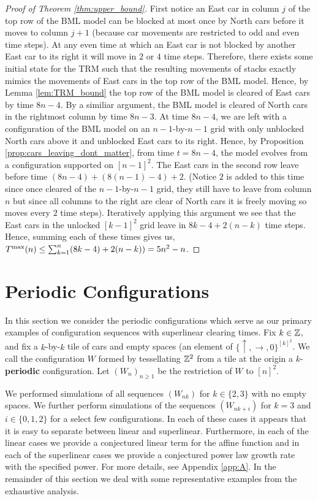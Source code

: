 \documentclass[reqno]{amsart}
\begin{document}
\begin{proof} [Proof of Theorem \ref{thm:upper_bound}]
    First notice an East car in column $j$ of the top row of the BML model can be blocked at most once by North cars before it moves to column $j+1$ (because car movements are restricted to odd and even time steps). At any even time at which an East car is not blocked by another East car to its right it will move in $2$ or $4$ time steps. Therefore, there exists some initial state for the TRM such that the resulting movements of stacks exactly mimics the movements of East cars in the top row of the BML model. Hence, by Lemma \ref{lem:TRM_bound} the top row of the BML model is cleared of East cars by time $8n-4$. By a similiar argument, the BML model is cleared of North cars in the rightmost column by time $8n-3$. At time $8n-4$, we are left with a configuration of the BML model on an $n-1 $-by-$ n-1$ grid with only unblocked North cars above it and unblocked East cars to its right. Hence, by Proposition \ref{prop:cars_leaving_dont_matter}, from time $t=8n-4$, the model evolves from a configuration supported on $ [n-1]^2$. The East cars in the second row leave before time $(8n-4) + (8(n-1)-4)+2$. (Notice $2$ is added to this time since once cleared of the $n-1 $-by-$ n-1$ grid, they still have to leave from column $n$ but since all columns to the right are clear of North cars it is freely moving so moves every $2$ time steps). Iteratively applying this argument we see that the East cars in the unlocked $[k-1]^2$ grid leave in $8k-4 + 2(n-k)$ time steps. Hence, summing each of these times gives us,
    $T^{\text{\rm max}}(n) \leq \sum_{k=1}^n (8k-4) + 2(n-k)) = 5n^2-n$.
\end{proof}

\section{Periodic Configurations}
In this section we consider the periodic configurations which serve as our primary examples of configuration sequences with superlinear clearing times. Fix $k \in \mathbb{Z}$, and fix a $k$-by-$k$ tile of cars and empty spaces (an element of $\{ \uparrow, \rightarrow,0 \}^{[k]^2}$. We call the configuration $W$ formed by tessellating $\mathbb{Z}^2$ from a tile at the origin a $k$-\textbf{periodic} configuration. Let $(W_n)_{n \geq 1}$ be the restriction of $W$ to $[n]^2$.

We performed simulations of all sequences $(W_{nk})$ for $k \in \{2,3\}$ with no empty spaces. We further perform simulations of the sequences $(W_{nk+i})$ for $k = 3$ and $i \in \{0,1,2\}$ for a select few configurations. In each of these cases it appears that it is easy to separate between linear and superlinear. Furthermore, in each of the linear cases we provide a conjectured linear term for the affine function and in each of the superlinear cases we provide a conjectured power law growth rate with the specified power. For more details, see Appendix \ref{app:A}. In the remainder of this section we deal with some representative examples from the exhaustive analysis.
\end{document}
